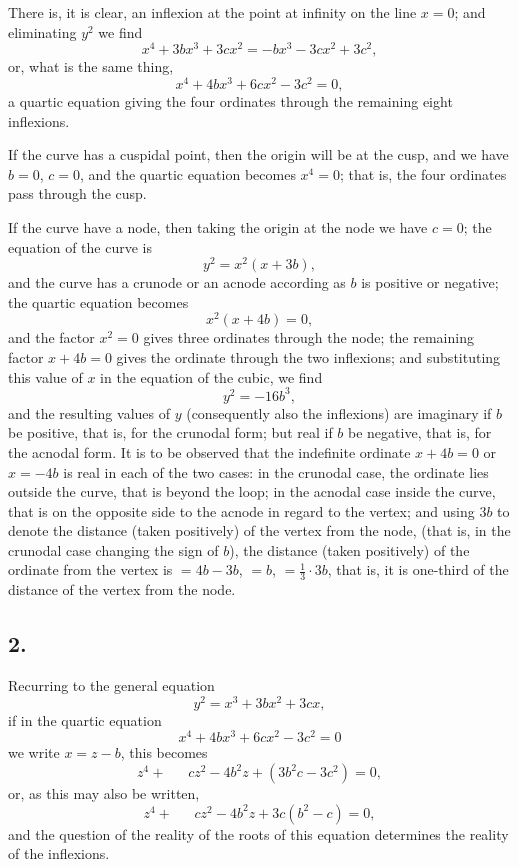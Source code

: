 \documentclass[11pt,a4paper]{article}
\theoremstyle{definition}
\begin{document}
There is, it is clear, an inflexion at the point at infinity on the line $x = 0$; and
eliminating $y^{2}$ we find
\[
x^{4} + 3bx^{3} + 3cx^{2} = -bx^{3} - 3cx^{2} + 3c^{2},
\]
or, what is the same thing,
\[
x^{4} + 4bx^{3} + 6cx^{2} - 3c^{2} = 0,
\]
a quartic equation giving the four ordinates through the remaining eight inflexions.

If the curve has a cuspidal point, then the origin will be at the cusp, and we
have $b = 0$, $c = 0$, and the quartic equation becomes $x^{4} = 0$; that is, the four ordinates
pass through the cusp.

If the curve have a node, then taking the origin at the node we have $c = 0$;
the equation of the curve is
\[
y^{2} = x^{2}(x + 3b),
\]
and the curve has a crunode or an acnode according as $b$ is positive or negative;
the quartic equation becomes
\[
x^{2}(x + 4b) = 0,
\]
and the factor $x^{2} = 0$ gives three ordinates through the node; the remaining factor
$x + 4b = 0$ gives the ordinate through the two inflexions; and substituting this value
of $x$ in the equation of the cubic, we find
\[
y^{2} = -16b^{3},
\]
and the resulting values of $y$ (consequently also the inflexions) are imaginary if $b$ be
positive, that is, for the crunodal form; but real if $b$ be negative, that is, for the
acnodal form. It is to be observed that the indefinite ordinate $x + 4b = 0$ or $x = -4b$
is real in each of the two cases: in the crunodal case, the ordinate lies outside the
curve, that is beyond the loop; in the acnodal case inside the curve, that is on the
opposite side to the acnode in regard to the vertex; and using $3b$ to denote the distance
(taken positively) of the vertex from the node, (that is, in the crunodal case changing
the sign of $b$), the distance (taken positively) of the ordinate from the vertex is
$= 4b - 3b$, $= b$, $= \frac{1}{3}\cdot 3b$, that is, it is one-third of the distance of the vertex from the
node.

\newpage
\subsection*{2.}

Recurring to the general equation
\[
y^{2} = x^{3} + 3bx^{2} + 3cx,
\]
if in the quartic equation
\[
x^{4} + 4bx^{3} + 6cx^{2} - 3c^{2} = 0
\]
we write $x = z - b$, this becomes
\[
z^{4} + \quad\;\; cz^{2} - 4b^{2}z + (3b^{2}c - 3c^{2}) = 0,
\]
or, as this may also be written,
\[
z^{4} + \quad\;\; cz^{2} - 4b^{2}z + 3c(b^{2} - c) = 0,
\]
and the question of the reality of the roots of this equation determines the reality of
the inflexions.
\end{document}
